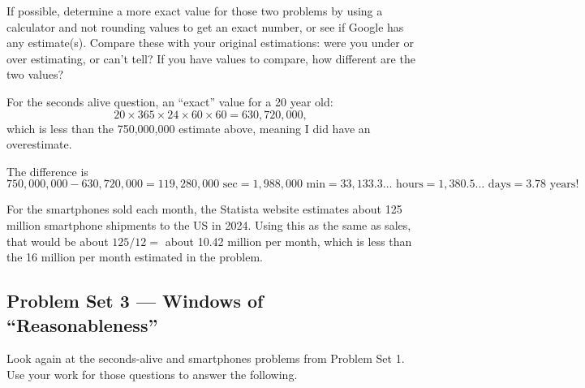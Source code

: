 \documentclass[12pt]{ximera}
\begin{document}
\begin{problem}
If possible, determine a more exact value for those two problems by using a calculator
and not rounding values to get an exact number, or see if Google has any estimate(s).
Compare these with your original estimations: were you under or over estimating, or
can't tell? If you have values to compare, how different are the two values?

\begin{freeResponse}
\end{freeResponse}

\begin{solution}
For the seconds alive question, an ``exact'' value for a 20 year old:
\[
20 \times 365 \times 24 \times 60 \times 60 = 630{,}720{,}000,
\]
which is less than the 750,000,000 estimate above, meaning I did have an overestimate.

The difference is
\[
750{,}000{,}000 - 630{,}720{,}000 = 119{,}280{,}000 \text{ sec} = 1{,}988{,}000 \text{ min}
= 33{,}133.3\ldots \text{ hours} = 1{,}380.5\ldots \text{ days} = 3.78 \text{ years!}
\]

For the smartphones sold each month, the Statista website estimates about 125 million
smartphone shipments to the US in 2024. Using this as the same as sales, that would be
about $125/12 = $ about 10.42 million per month, which is less than the 16 million per
month estimated in the problem.
\end{solution}
\end{problem}

\subsection*{Problem Set 3 --- Windows of ``Reasonableness''}

Look again at the seconds-alive and smartphones problems from Problem Set 1. Use your
work for those questions to answer the following.
\end{document}
